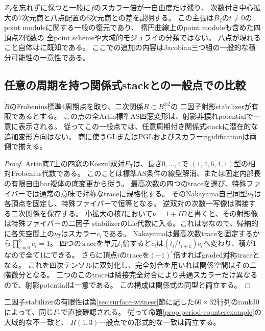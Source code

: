 \begin{remark}
$Z_f$を忘れずに保つと一般に$f$のスカラー倍が一自由度だけ残り、
次数付き中心拡大の7次元商と八点配置の6次元商との差を説明する。
この主張は$B_f$の$t\ne0$のpoint moduleに関する一般の復元であり、
楕円曲線上のpoint moduleも含めた四頂点Z代数の
全point schemeや大域的モジュライの分類ではない。
八点が現れること自体は\cite[Propositions 4.3.7, 4.3.9]{LBS}に既知である。
ここでの追加の内容はJacobian三つ組の一般的な積分可能性の一意性である。
\end{remark}

\subsection{任意の周期を持つ関係式stackとの一般点での比較}
\begin{proposition}\label{prop:period-formal-rigidity}
$\check B$のFrobenius標準4周期点を取り、二次関係$R\subset B_1^{\otimes2}$の
二因子射影stabilizerが有限であるとする。
この点の全Artin標準AS四窓変形は、射影非捩れpotentialで一意に表示される。
従ってこの一般点では、任意周期付き関係式stackに潜在的な追加変形方向はない。
商に使うGLまたはPGLおよびスカラーrigidificationは両側で揃える。
\end{proposition}
\begin{proof}
Artin底$T$上の四窓のKoszul双対$E_T$は、長さ$0,\dots,4$で
$(1,4,6,4,1)$型の相対Frobenius代数である。
このことは標準AS条件の線型解消、または固定内部長の有限自由bar複体の底変更から従う。
最高次数の四つのtraceを選び、特殊ファイバーでは通常の意味で対称なtraceに規格化する。
そのNakayama自己同型$\nu_T$は各頂点を固定し、特殊ファイバーで恒等となる。
逆双対の次数一写像は隣接する二次関係を保存する。
小拡大の核$I$において$\nu=1+I D$と書くと、その射影像は特殊ファイバーの二因子
stabilizerのLie代数に入る。これは零なので、帰納的に各矢空間上の$\nu_T$はスカラー$c_i$である。
Nakayamaは最高次数traceを固定するから$\prod_{i=0}^3c_i=1$。
四つのtraceを単元$t_i$倍すると$c_i$は$(t_i/t_{i+1})c_i$へ変わり、積が1なので全て1にできる。
さらに頂点$i$のtraceを$(-1)^i$倍すればgraded対称traceとなる。
これを四次テンソルに双対化し、完全対合を用いれば関係空間はその二階微分となる。
二つのこのtraceは隣接完全対合により共通スカラーだけ異なるので、射影potentialは一意である。
この構成は関係式の同型と両立する。
\end{proof}
二因子stabilizerの有限性は第\ref{sec:surface-witness}節に記した$60\times32$行列のrank30によって、同じ$F_*$で直接確認される。
従って命題\ref{prop:period-counterexample}の大域的な不一致と、
$R(1,3)$一般点での形式的な一致は両立する。


